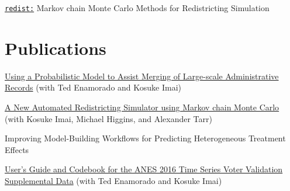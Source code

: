 \documentclass[]{deedy-resume-openfont}
\begin{document}
\begin{minipage}[t]{0.33\textwidth}
\href{https://github.com/kosukeimai/redist}{\texttt{redist:}} Markov chain Monte Carlo Methods for Redistricting Simulation
\sectionsep

\section{Publications}
\href{https://imai.fas.harvard.edu/research/linkage.html}{Using a Probabilistic Model to Assist Merging of Large-scale Administrative Records} (with Ted Enamorado and Kosuke Imai)\\\vspace{2mm}

\href{https://imai.fas.harvard.edu/research/files/redist.pdf}{A New Automated Redistricting Simulator using Markov chain Monte Carlo} (with Kosuke Imai, Michael Higgins, and Alexander Tarr)\\\vspace{2mm}

Improving Model-Building Workflows for Predicting Heterogeneous Treatment Effects\\\vspace{2mm}

\href{https://www.electionstudies.org/wp-content/uploads/2018/03/anes_timeseries_2016voteval_userguidecodebook.pdf}{User’s Guide and Codebook for the ANES 2016 Time Series Voter Validation Supplemental Data} (with Ted Enamorado and Kosuke Imai)
\sectionsep

%
%

\end{minipage} 
\hfill
\end{document}
